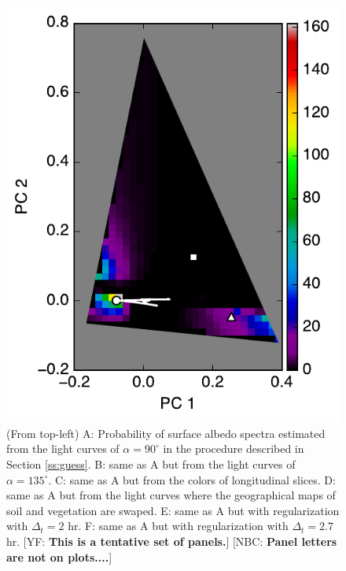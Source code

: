 \documentclass[iop,numberedappendix,apj,]{emulateapj}
\def\memoYF#1{\color{red}[YF: {\bf #1}]\color{black}}
\def\memoNBC#1{\color{blue}[NBC: {\bf #1}]\color{black}}
\begin{document}
\begin{figure}[tbh!]
\begin{minipage}{0.33\hsize}
\begin{center}
\includegraphics[width=\hsize]{mockdata_90deg_3types_t12_lc_reg_l40deg.pdf}
    \end{center}
     \end{minipage}
    \caption{(From top-left) A: Probability of surface albedo spectra estimated from the light curves of $\alpha = 90^{\circ }$ in the procedure described in Section \ref{ss:guess}. B: same as A but from the light curves of  $\alpha = 135^{\circ }$. C: same as A but from the colors of longitudinal slices.  D: same as A but from the light curves where the geographical maps of soil and vegetation are swaped. E: same as A but with regularization with $\Delta_ t = 2$ hr. F: same as A but with regularization with $\Delta_ t = 2.7$ hr. \memoYF{This is a tentative set of panels.} \memoNBC{Panel letters are not on plots....}}
\label{fig:noreg}
\end{figure}
\end{document}
